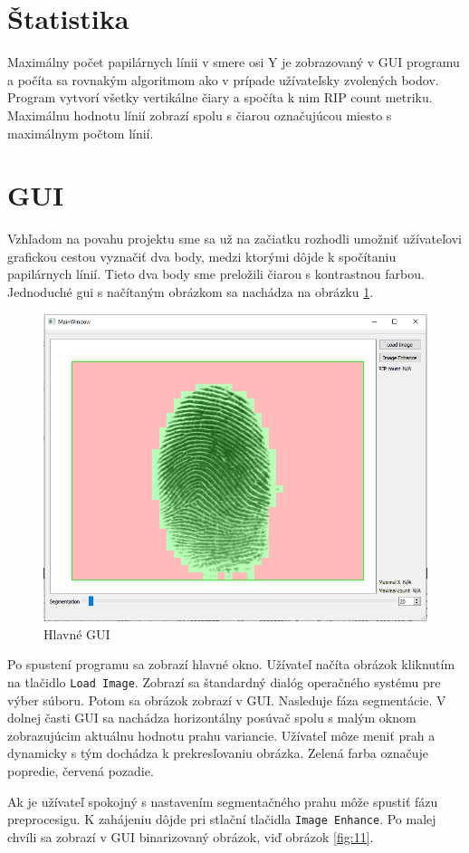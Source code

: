 \documentclass[11pt,a4paper]{article}
\begin{document}
\section*{Štatistika}
Maximálny počet papilárnych línii v smere osi Y je zobrazovaný v GUI programu a počíta sa rovnakým algoritmom ako v prípade užívateľsky zvolených bodov. Program vytvorí všetky vertikálne čiary a spočíta k nim RIP count metriku. Maximálnu hodnotu línií zobrazí spolu s čiarou označujúcou miesto s maximálnym počtom línií.


\section*{GUI}
Vzhľadom na povahu projektu sme sa už na začiatku rozhodli umožniť užívateľovi grafickou cestou vyznačiť dva body, medzi ktorými dôjde k spočítaniu papilárnych línií. Tieto dva body sme preložili čiarou s kontrastnou farbou. 
Jednoduché gui s načítaným obrázkom sa nachádza na obrázku \ref{fig:10}.
\begin{figure}[h!]
	\centering
	\includegraphics[width=.7\linewidth]{images/Screenshot_14}
	\caption{Hlavné GUI}
	\label{fig:10}
\end{figure}

Po spustení programu sa zobrazí hlavné okno. Užívateľ načíta obrázok kliknutím na tlačidlo \texttt{Load Image}. Zobrazí sa štandardný dialóg operačného systému pre výber súboru. Potom sa obrázok zobrazí v GUI. Nasleduje fáza segmentácie. V dolnej časti GUI sa nachádza horizontálny posúvač spolu s malým oknom zobrazujúcim aktuálnu hodnotu prahu variancie. Užívateľ môze meniť prah a dynamicky s tým dochádza k prekresľovaniu obrázka. Zelená farba označuje popredie, červená pozadie.

Ak je užívateľ spokojný s nastavením segmentačného prahu môže spustiť fázu preprocesigu. K zahájeniu dôjde pri  stlační tlačidla \texttt{Image Enhance}. Po malej chvíli sa zobrazí v GUI binarizovaný obrázok, viď obrázok \ref{fig:11}. 
\end{document}
